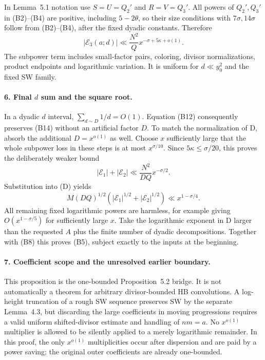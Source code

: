 In Lemma~5.1 notation use $S=U=Q_2'$ and $R=V=Q_3'$.
All powers of $Q_2',Q_3'$ in (B2)--(B4) are positive, including
$5-2\theta$, so their size conditions with $7\sigma,14\sigma$
follow from (B2)--(B4), after the fixed dyadic constants. Therefore
\[
 |\mathcal E_3(a;d)|
 \ll\frac{N^2}{Q}x^{-\sigma+5\kappa+o(1)}.                \tag{B14}
\]
The subpower term includes small-factor pairs, coloring, divisor
normalizations, product endpoints and logarithmic variation.
It is uniform for $d\ll y_0^2$ and the fixed SW family.

\paragraph{6. Final $d$ sum and the square root.}
In a dyadic $d$ interval, $\sum_{d\sim D}1/d=O(1)$.
Equation (B12) consequently preserves (B14) without an artificial
factor $D$. To match the normalization of D, absorb the additional
$D=x^{o(1)}$ as well. Choose $x$ sufficiently large that the whole
subpower loss in these steps is at most $x^{\sigma/10}$. Since
$5\kappa\le\sigma/20$, this proves the deliberately weaker bound
\[
 |\mathcal E_1|+|\mathcal E_2|
 \ll\frac{N^2}{DQ}x^{-\sigma/2}.                          \tag{B15}
\]
Substitution into (D) yields
\[
 M(DQ)^{1/2}(|\mathcal E_1|^{1/2}+|\mathcal E_2|^{1/2})
 \ll x^{1-\sigma/4}.
\]
All remaining fixed logarithmic powers are harmless, for example
giving $O(x^{1-\sigma/5})$ for sufficiently large $x$. Take the
logarithmic exponent in D larger than the requested $A$ plus the
finite number of dyadic decompositions. Together with (B8) this
proves (B5), subject exactly to the inputs at the beginning.

\paragraph{7. Coefficient scope and the unresolved earlier boundary.}
This proposition is the one-bounded Proposition~5.2 bridge. It is
not automatically a theorem for arbitrary divisor-bounded HB
convolutions. A log-height truncation of a rough SW sequence preserves
SW by the separate Lemma~4.3, but discarding the large coefficients
in moving progressions requires a valid uniform shifted-divisor
estimate and handling of $nm=a$. No $x^{o(1)}$ multiplier is allowed
to be silently applied to a merely logarithmic remainder. In this
proof, the only $x^{o(1)}$ multiplicities occur after dispersion and
are paid by a power saving; the original outer coefficients are
already one-bounded.

